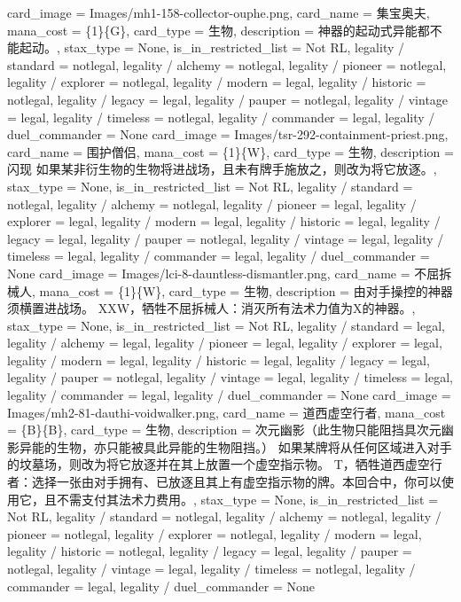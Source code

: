 \documentclass[lang = cn, color = black, 10pt]{AllThatStax}
\begin{document}
\card
{
	card_image = Images/mh1-158-collector-ouphe.png,
	card_name = 集宝奥夫,
	mana_cost = \{1\}\{G\},
	card_type = 生物,
	description = 神器的起动式异能都不能起动。,
	stax_type = None,
	is_in_restricted_list = Not RL,
	legality / standard = notlegal,
	legality / alchemy = notlegal,
	legality / pioneer = notlegal,
	legality / explorer = notlegal,
	legality / modern = legal,
	legality / historic = notlegal,
	legality / legacy = legal,
	legality / pauper = notlegal,
	legality / vintage = legal,
	legality / timeless = notlegal,
	legality / commander = legal,
	legality / duel_commander = None
}
\card
{
	card_image = Images/tsr-292-containment-priest.png,
	card_name = 围护僧侣,
	mana_cost = \{1\}\{W\},
	card_type = 生物,
	description = 闪现
	如果某非衍生物的生物将进战场，且未有牌手施放之，则改为将它放逐。,
	stax_type = None,
	is_in_restricted_list = Not RL,
	legality / standard = notlegal,
	legality / alchemy = notlegal,
	legality / pioneer = legal,
	legality / explorer = legal,
	legality / modern = legal,
	legality / historic = legal,
	legality / legacy = legal,
	legality / pauper = notlegal,
	legality / vintage = legal,
	legality / timeless = legal,
	legality / commander = legal,
	legality / duel_commander = None
}
\card
{
	card_image = Images/lci-8-dauntless-dismantler.png,
	card_name = 不屈拆械人,
	mana_cost = \{1\}\{W\},
	card_type = 生物,
	description = 由对手操控的神器须横置进战场。
	{X}{X}{W}，牺牲不屈拆械人：消灭所有法术力值为X的神器。,
	stax_type = None,
	is_in_restricted_list = Not RL,
	legality / standard = legal,
	legality / alchemy = legal,
	legality / pioneer = legal,
	legality / explorer = legal,
	legality / modern = legal,
	legality / historic = legal,
	legality / legacy = legal,
	legality / pauper = notlegal,
	legality / vintage = legal,
	legality / timeless = legal,
	legality / commander = legal,
	legality / duel_commander = None
}
\card
{
	card_image = Images/mh2-81-dauthi-voidwalker.png,
	card_name = 道西虚空行者,
	mana_cost = \{B\}\{B\},
	card_type = 生物,
	description = 次元幽影（此生物只能阻挡具次元幽影异能的生物，亦只能被具此异能的生物阻挡。）
	如果某牌将从任何区域进入对手的坟墓场，则改为将它放逐并在其上放置一个虚空指示物。
	{T}，牺牲道西虚空行者：选择一张由对手拥有、已放逐且其上有虚空指示物的牌。本回合中，你可以使用它，且不需支付其法术力费用。,
	stax_type = None,
	is_in_restricted_list = Not RL,
	legality / standard = notlegal,
	legality / alchemy = notlegal,
	legality / pioneer = notlegal,
	legality / explorer = notlegal,
	legality / modern = legal,
	legality / historic = notlegal,
	legality / legacy = legal,
	legality / pauper = notlegal,
	legality / vintage = legal,
	legality / timeless = notlegal,
	legality / commander = legal,
	legality / duel_commander = None
}
\end{document}
